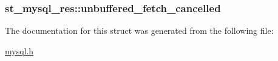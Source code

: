 \subsubsection[{unbuffered\+\_\+fetch\+\_\+cancelled}]{ st\+\_\+mysql\+\_\+res\+::unbuffered\+\_\+fetch\+\_\+cancelled}\label{structst__mysql__res_a4fddbf81b6ead57fdfd384e74d918cfb}


The documentation for this struct was generated from the following file\+:\begin{DoxyCompactItemize}
\item 
\hyperlink{mysql_8h}{mysql.\+h}\end{DoxyCompactItemize}

